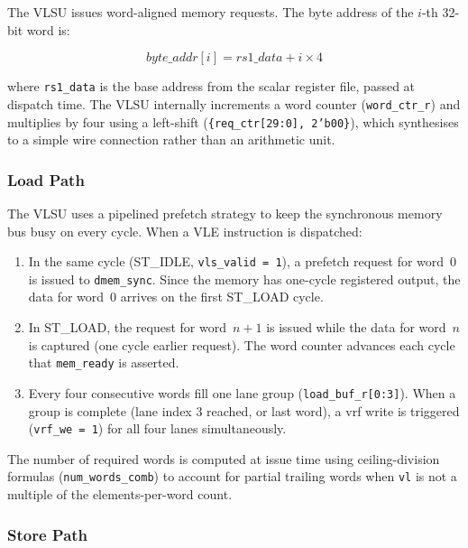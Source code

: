 The VLSU issues word-aligned memory requests. The byte address of the $i$-th 32-bit
word is:

\begin{equation}
\mathit{byte\_addr}[i] = \mathit{rs1\_data} + i \times 4
\label{eq:vlsu_addr}
\end{equation}

where \texttt{rs1\_data} is the base address from the scalar register file, passed at
dispatch time. The VLSU internally increments a word counter (\texttt{word\_ctr\_r})
and multiplies by four using a left-shift (\texttt{\{req\_ctr[29:0], 2'b00\}}), which
synthesises to a simple wire connection rather than an arithmetic unit.

\subsubsection{Load Path}

The VLSU uses a pipelined prefetch strategy to keep the synchronous memory bus busy
on every cycle. When a VLE instruction is dispatched:

\begin{enumerate}
  \item In the same cycle (ST\_IDLE, \texttt{vls\_valid = 1}), a prefetch request for
    word~0 is issued to \texttt{dmem\_sync}. Since the memory has one-cycle registered
    output, the data for word~0 arrives on the first ST\_LOAD cycle.
  \item In ST\_LOAD, the request for word~$n+1$ is issued while the data for word~$n$
    is captured (one cycle earlier request). The word counter advances each cycle that
    \texttt{mem\_ready} is asserted.
  \item Every four consecutive words fill one lane group (\texttt{load\_buf\_r[0:3]}).
    When a group is complete (lane index 3 reached, or last word), a \gls{vrf} write
    is triggered (\texttt{vrf\_we = 1}) for all four lanes simultaneously.
\end{enumerate}

The number of required words is computed at issue time using ceiling-division formulas
(\texttt{num\_words\_comb}) to account for partial trailing words when \texttt{vl}
is not a multiple of the elements-per-word count.

\subsubsection{Store Path}

